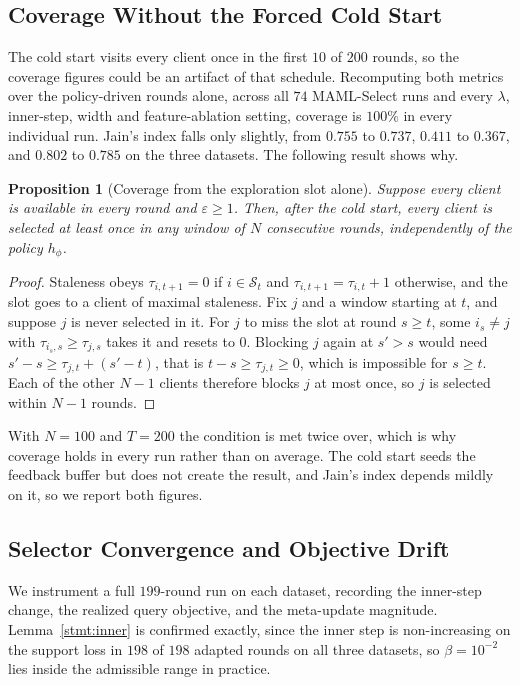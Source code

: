 \documentclass[journal]{IEEEtran}
\newtheorem{proposition}{Proposition}
\theoremstyle{remark}
\newcommand{\revtwo}[1]{#1}
\begin{document}
\subsection{\revtwo{Coverage Without the Forced Cold Start}}\label{sec:fairness_recheck}
\revtwo{The cold start visits every client once in the first $10$ of $200$ rounds, so the coverage figures could be an artifact of that schedule. Recomputing both metrics over the policy-driven rounds alone, across all $74$ MAML-Select runs and every $\lambda$, inner-step, width and feature-ablation setting, coverage is $100\%$ in every individual run. Jain's index falls only slightly, from $0.755$ to $0.737$, $0.411$ to $0.367$, and $0.802$ to $0.785$ on the three datasets. The following result shows why.}

\begin{proposition}[\revtwo{Coverage from the exploration slot alone}]\label{prop:coverage}
\revtwo{Suppose every client is available in every round and $\varepsilon\ge 1$. Then, after the cold start, every client is selected at least once in any window of $N$ consecutive rounds, independently of the policy $h_\phi$.}
\end{proposition}
\begin{proof}
\revtwo{Staleness obeys $\tau_{i,t+1}=0$ if $i\in\mathcal{S}_t$ and $\tau_{i,t+1}=\tau_{i,t}+1$ otherwise, and the slot goes to a client of maximal staleness. Fix $j$ and a window starting at $t$, and suppose $j$ is never selected in it. For $j$ to miss the slot at round $s\ge t$, some $i_s\neq j$ with $\tau_{i_s,s}\ge\tau_{j,s}$ takes it and resets to $0$. Blocking $j$ again at $s'>s$ would need $s'-s\ge\tau_{j,t}+(s'-t)$, that is $t-s\ge\tau_{j,t}\ge 0$, which is impossible for $s\ge t$. Each of the other $N-1$ clients therefore blocks $j$ at most once, so $j$ is selected within $N-1$ rounds.}
\end{proof}
\revtwo{With $N=100$ and $T=200$ the condition is met twice over, which is why coverage holds in every run rather than on average. The cold start seeds the feedback buffer but does not create the result, and Jain's index depends mildly on it, so we report both figures.}

\subsection{\revtwo{Selector Convergence and Objective Drift}}\label{sec:selector_convergence}
\revtwo{We instrument a full $199$-round run on each dataset, recording the inner-step change, the realized query objective, and the meta-update magnitude. Lemma~\ref{stmt:inner} is confirmed exactly, since the inner step is non-increasing on the support loss in $198$ of $198$ adapted rounds on all three datasets, so $\beta=10^{-2}$ lies inside the admissible range in practice.}
\end{document}
